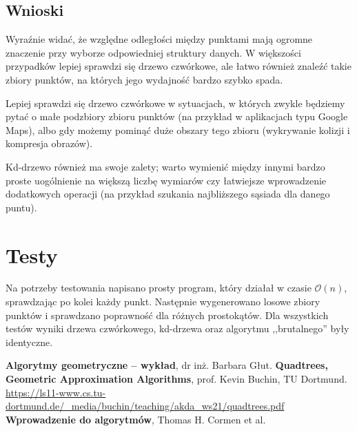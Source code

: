 \documentclass[12pt]{scrartcl}
\newcommand{\sO}{\mathcal O}
\begin{document}
\subsection{Wnioski}
Wyraźnie widać, że względne odległości między punktami mają ogromne znaczenie przy wyborze odpowiedniej struktury danych. W większości przypadków lepiej sprawdzi się drzewo czwórkowe, ale łatwo również znaleźć takie zbiory punktów, na których jego wydajność bardzo szybko spada.

Lepiej sprawdzi się drzewo czwórkowe w sytuacjach, w których zwykle będziemy pytać o małe podzbiory zbioru punktów (na przykład w aplikacjach typu Google Maps), albo gdy możemy pominąć duże obszary tego zbioru (wykrywanie kolizji i kompresja obrazów).

Kd-drzewo również ma swoje zalety; warto wymienić między innymi bardzo proste uogólnienie na większą liczbę wymiarów czy łatwiejsze wprowadzenie dodatkowych operacji (na przykład szukania najbliższego sąsiada dla danego puntu).



\section{Testy}
Na potrzeby testowania napisano prosty program, który działał w czasie $\sO(n)$, sprawdzając po kolei każdy punkt. Następnie wygenerowano losowe zbiory punktów i sprawdzano poprawność dla różnych prostokątów. Dla wszystkich testów wyniki drzewa czwórkowego, kd-drzewa oraz algorytmu ,,brutalnego'' były identyczne.

\begin{thebibliography}{9}
     \textbf{Algorytmy geometryczne -- wykład}, dr inż. Barbara Głut.
     \textbf{Quadtrees, Geometric Approximation Algorithms}, prof. Kevin Buchin, TU Dortmund.
        \url{https://ls11-www.cs.tu-dortmund.de/_media/buchin/teaching/akda_ws21/quadtrees.pdf}
         \textbf{Wprowadzenie do algorytmów}, Thomas H. Cormen et al.
\end{thebibliography}
\end{document}
